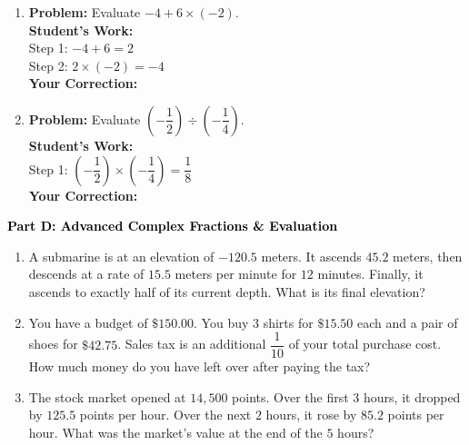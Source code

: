 \documentclass[12pt, letterpaper, fleqn]{article}
\begin{document}
\begin{enumerate}[itemsep=5.5cm, leftmargin=0.6cm, resume]
\item \textbf{Problem:} Evaluate $-4 + 6 \times (-2)$.\\
\textbf{Student's Work:} \\
Step 1: $-4 + 6 = 2$\\
Step 2: $2 \times (-2) = -4$\\
\textbf{Your Correction:}
\item \textbf{Problem:} Evaluate $\left(-\dfrac{1}{2}\right) \div \left(-\dfrac{1}{4}\right)$.\\
\textbf{Student's Work:} \\
Step 1: $\left(-\dfrac{1}{2}\right) \times \left(-\dfrac{1}{4}\right) = \dfrac{1}{8}$\\
\textbf{Your Correction:}
\end{enumerate}

\newpage

\begin{tcolorbox}[colback=customteal!20]
\large\textcolor{black}{\textbf{Part D: Advanced Complex Fractions \& Evaluation}}
\end{tcolorbox}

\vspace{3mm}

\begin{enumerate}[itemsep=5.5cm, leftmargin=0.6cm, resume]
\item A submarine is at an elevation of $-120.5$ meters. It ascends $45.2$ meters, then descends at a rate of $15.5$ meters per minute for $12$ minutes. Finally, it ascends to exactly half of its current depth. What is its final elevation?
\item You have a budget of $\$150.00$. You buy $3$ shirts for $\$15.50$ each and a pair of shoes for $\$42.75$. Sales tax is an additional $\dfrac{1}{10}$ of your total purchase cost. How much money do you have left over after paying the tax?
\item The stock market opened at $14,500$ points. Over the first $3$ hours, it dropped by $125.5$ points per hour. Over the next $2$ hours, it rose by $85.2$ points per hour. What was the market's value at the end of the $5$ hours?
\end{enumerate}
\end{document}
